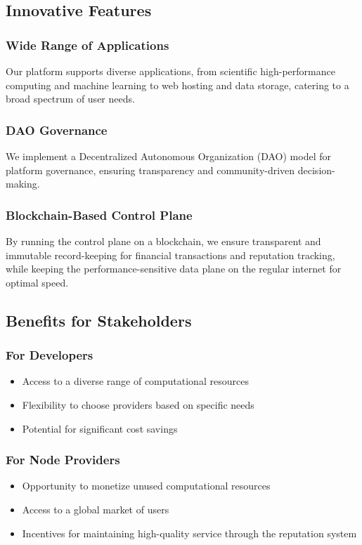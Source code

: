 \subsection{Innovative Features}

\subsubsection{Wide Range of Applications}
Our platform supports diverse applications, from scientific high-performance computing and machine learning to web hosting and data storage, catering to a broad spectrum of user needs.

\subsubsection{DAO Governance}
We implement a Decentralized Autonomous Organization (DAO) model for platform governance, ensuring transparency and community-driven decision-making.

\subsubsection{Blockchain-Based Control Plane}
By running the control plane on a blockchain, we ensure transparent and immutable record-keeping for financial transactions and reputation tracking, while keeping the performance-sensitive data plane on the regular internet for optimal speed.

\subsection{Benefits for Stakeholders}

\subsubsection{For Developers}
\begin{itemize}
    \item Access to a diverse range of computational resources
    \item Flexibility to choose providers based on specific needs
    \item Potential for significant cost savings
\end{itemize}

\subsubsection{For Node Providers}
\begin{itemize}
    \item Opportunity to monetize unused computational resources
    \item Access to a global market of users
    \item Incentives for maintaining high-quality service through the reputation system
\end{itemize}

